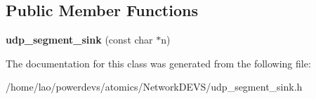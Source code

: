 \subsection*{Public Member Functions}
\begin{DoxyCompactItemize}
\item 
{\bfseries udp\+\_\+segment\+\_\+sink} (const char $\ast$n)\hypertarget{classudp__segment__sink_a61bd73218f0cb2ea949aada272f37fde}{}\label{classudp__segment__sink_a61bd73218f0cb2ea949aada272f37fde}

\end{DoxyCompactItemize}


The documentation for this class was generated from the following file\+:\begin{DoxyCompactItemize}
\item 
/home/lao/powerdevs/atomics/\+Network\+D\+E\+V\+S/udp\+\_\+segment\+\_\+sink.\+h\end{DoxyCompactItemize}
